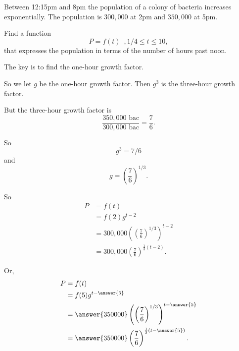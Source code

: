 \documentclass{ximera}
\begin{document}
\begin{example} \label{Ex8femvemaz}

Between 12:15pm and 8pm the population of a colony of bacteria increases exponentially. The population is $300,000$ at 2pm and $350,000$ at 5pm.

Find a function 
\[
  P=f(t) \, \, \, , 1/4\leq t \leq 10,
\]
that expresses the population in terms of the number of hours past noon.

\begin{explanation}
The key is to find the one-hour growth factor. 

So we let $g$ be the one-hour growth factor. Then $g^3$ is the three-hour growth factor.

But the three-hour growth factor is
\[
  \frac{350,000\text{ bac}}{300,000\text{ bac}} = \frac{7}{6}.
\]

So
\[
  g^3 = 7/6
\] 
and
\[
  g = \left( \frac{7}{6} \right)^{1/3}.
\]

So
\begin{align*}
     P  &= f(t) \\
         &= f(2) g^{t-2} \\
         &= 300,000 \left(   \left( \frac{7}{6} \right)^{1/3}\right)^{t-2} \\
         &= 300,000 \left( \frac{7}{6} \right)^{\frac{1}{3}\left( t-2 \right)}.
\end{align*}

Or,
\begin{align*}
     P  &= f(t) \\
         &= f(5) g^{t-\answer{5}} \\
         &= \answer{350000} \left(   \left( \frac{7}{6} \right)^{1/3}\right)^{t-\answer{5}} \\
         &= \answer{350000} \left( \frac{7}{6} \right)^{\frac{1}{3}\left( t-\answer{5} \right)}.
\end{align*}

\end{explanation}

\end{example}
\end{document}
